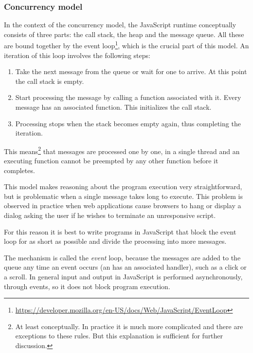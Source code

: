 \subsubsection{Concurrency model}
In the context of the concurrency model, the JavaScript runtime conceptually
consists of three parts: the call stack, the heap and the message queue. All
these are bound together by the event
loop\footnote{\url{https://developer.mozilla.org/en-US/docs/Web/JavaScript/EventLoop}},
which is the crucial part of this model.  An iteration of this loop involves the
following steps:
\begin{enumerate}
	\item Take the next message from the queue or wait for one to arrive. At
          this point the call stack is empty.
	\item Start processing the message by calling a function associated with
          it. Every message has an associated function. This initializes the
          call stack.
	\item Processing stops when the stack becomes empty again, thus
          completing the iteration.
\end{enumerate}

This means\footnote{At least conceptually. In practice it is much more
  complicated and there are exceptions to these rules. But this explanation is
  sufficient for further discussion.}
 that messages are processed one by one, in
a single thread and an executing function cannot be preempted by any other
function before it completes.

This model makes reasoning about the program execution very straightforward, but
is problematic when a single message takes long to execute. This problem is
observed in practice when web applications cause browsers to hang or display a
dialog asking the user if he wishes to terminate an unresponsive script.

For this reason it is best to write programs in JavaScript that block the event
loop for as short as possible and divide the processing into more messages.

The mechanism is called the \textit{event} loop, because the messages are added
to the queue any time an event occurs (an has an associated handler), such as a
click or a scroll. In general input and output in JavaScript is performed
asynchronously, through events, so it does not block program execution.


